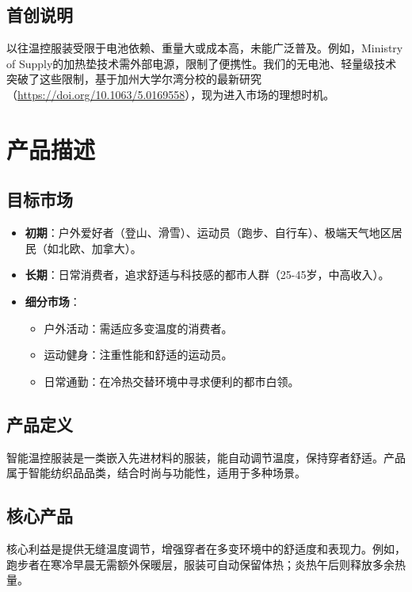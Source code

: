 \documentclass[UTF8]{report}
\theoremstyle{MyLineTheoremStyle} %
\theoremstyle{MyBlockTheoremStyle} %
\theoremstyle{MySubsubsectionStyle} %
\begin{document}
\section{首创说明}
以往温控服装受限于电池依赖、重量大或成本高，未能广泛普及。例如，Ministry of Supply的加热垫技术需外部电源，限制了便携性。我们的无电池、轻量级技术突破了这些限制，基于加州大学尔湾分校的最新研究（\url{https://doi.org/10.1063/5.0169558}），现为进入市场的理想时机。

\chapter{产品描述}
\section{目标市场}
\begin{itemize}
    \item \textbf{初期}：户外爱好者（登山、滑雪）、运动员（跑步、自行车）、极端天气地区居民（如北欧、加拿大）。
    \item \textbf{长期}：日常消费者，追求舒适与科技感的都市人群（25-45岁，中高收入）。
    \item \textbf{细分市场}：
        \begin{itemize}
            \item 户外活动：需适应多变温度的消费者。
            \item 运动健身：注重性能和舒适的运动员。
            \item 日常通勤：在冷热交替环境中寻求便利的都市白领。
        \end{itemize}
\end{itemize}

\section{产品定义}
智能温控服装是一类嵌入先进材料的服装，能自动调节温度，保持穿者舒适。产品属于智能纺织品品类，结合时尚与功能性，适用于多种场景。

\section{核心产品}
核心利益是提供无缝温度调节，增强穿者在多变环境中的舒适度和表现力。例如，跑步者在寒冷早晨无需额外保暖层，服装可自动保留体热；炎热午后则释放多余热量。
\end{document}
